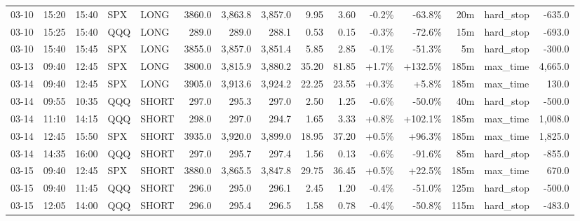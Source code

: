 \documentclass[11pt,a4paper,twoside]{article}
\begin{document}
\begin{landscape}
\begin{center}
\begin{longtable}{>{\color{txtmain}}l l l l l r r r r r r r r >{\color{txtmain}}l r}
03-10 & 15:20 & 15:40 & SPX & LONG & 3860.0 & 3,863.8 & 3,857.0 & 9.95 & 3.60 & \textcolor{lossred}{-0.2\%} & \textcolor{lossred}{-63.8\%} & 20m & hard\_stop & \textcolor{lossred}{-635.0} \\
03-10 & 15:25 & 15:40 & QQQ & LONG & 289.0 & 289.0 & 288.1 & 0.53 & 0.15 & \textcolor{lossred}{-0.3\%} & \textcolor{lossred}{-72.6\%} & 15m & hard\_stop & \textcolor{lossred}{-693.0} \\
03-10 & 15:40 & 15:45 & SPX & LONG & 3855.0 & 3,857.0 & 3,851.4 & 5.85 & 2.85 & \textcolor{lossred}{-0.1\%} & \textcolor{lossred}{-51.3\%} & 5m & hard\_stop & \textcolor{lossred}{-300.0} \\
03-13 & 09:40 & 12:45 & SPX & LONG & 3800.0 & 3,815.9 & 3,880.2 & 35.20 & 81.85 & \textcolor{wingreen}{+1.7\%} & \textcolor{wingreen}{+132.5\%} & 185m & max\_time & \textcolor{wingreen}{4,665.0} \\
03-14 & 09:40 & 12:45 & SPX & LONG & 3905.0 & 3,913.6 & 3,924.2 & 22.25 & 23.55 & \textcolor{wingreen}{+0.3\%} & \textcolor{wingreen}{+5.8\%} & 185m & max\_time & \textcolor{wingreen}{130.0} \\
03-14 & 09:55 & 10:35 & QQQ & SHORT & 297.0 & 295.3 & 297.0 & 2.50 & 1.25 & \textcolor{lossred}{-0.6\%} & \textcolor{lossred}{-50.0\%} & 40m & hard\_stop & \textcolor{lossred}{-500.0} \\
03-14 & 11:10 & 14:15 & QQQ & SHORT & 298.0 & 297.0 & 294.7 & 1.65 & 3.33 & \textcolor{wingreen}{+0.8\%} & \textcolor{wingreen}{+102.1\%} & 185m & max\_time & \textcolor{wingreen}{1,008.0} \\
03-14 & 12:45 & 15:50 & SPX & SHORT & 3935.0 & 3,920.0 & 3,899.0 & 18.95 & 37.20 & \textcolor{wingreen}{+0.5\%} & \textcolor{wingreen}{+96.3\%} & 185m & max\_time & \textcolor{wingreen}{1,825.0} \\
03-14 & 14:35 & 16:00 & QQQ & SHORT & 297.0 & 295.7 & 297.4 & 1.56 & 0.13 & \textcolor{lossred}{-0.6\%} & \textcolor{lossred}{-91.6\%} & 85m & hard\_stop & \textcolor{lossred}{-855.0} \\
03-15 & 09:40 & 12:45 & SPX & SHORT & 3880.0 & 3,865.5 & 3,847.8 & 29.75 & 36.45 & \textcolor{wingreen}{+0.5\%} & \textcolor{wingreen}{+22.5\%} & 185m & max\_time & \textcolor{wingreen}{670.0} \\
03-15 & 09:40 & 11:45 & QQQ & SHORT & 296.0 & 295.0 & 296.1 & 2.45 & 1.20 & \textcolor{lossred}{-0.4\%} & \textcolor{lossred}{-51.0\%} & 125m & hard\_stop & \textcolor{lossred}{-500.0} \\
03-15 & 12:05 & 14:00 & QQQ & SHORT & 296.0 & 295.4 & 296.5 & 1.58 & 0.78 & \textcolor{lossred}{-0.4\%} & \textcolor{lossred}{-50.8\%} & 115m & hard\_stop & \textcolor{lossred}{-483.0} \\

\end{longtable}
\end{center}
\end{landscape}
\end{document}
